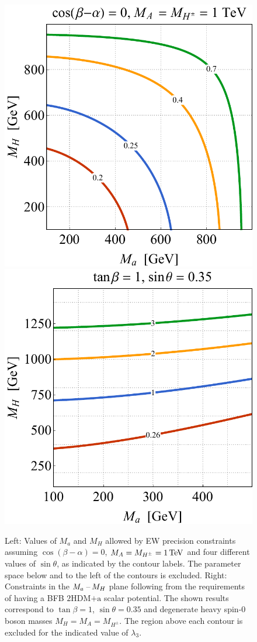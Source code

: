 \documentclass[a4paper, 11pt,notoc]{article}
\newcommand{\hdma}{\ensuremath{\textrm{2HDM+a}}\xspace}
\begin{document}
\begin{figure}[t!]
\centering
\includegraphics[height=.45\textwidth]{figure4l.pdf} \qquad 
\includegraphics[height=.45\textwidth]{figure4r.pdf}
\vspace{4mm}
\caption{\label{fig:EWVAC} Left: Values of $M_a$ and $M_H$ allowed by EW precision constraints assuming $\cos(\beta-\alpha)=0$, $M_A= M_{H^\pm}=1 \, {\rm TeV}$ and four different values of $\sin \theta$, as indicated by the contour labels.  The parameter space below and to the left of the contours is excluded. Right: Constraints in the $M_{a}\hspace{0.5mm}$--$\hspace{0.5mm} M_H$ plane following from the  requirements of having a  BFB \hdma scalar potential. The shown results correspond to $\tan \beta = 1$, $\sin \theta = 0.35$ and degenerate heavy spin-0 boson masses $M_H = M_A = M_{H^\pm}$. The region above  each contour  is excluded for the indicated value of $\lambda_3$.}  
\end{figure}
\end{document}
